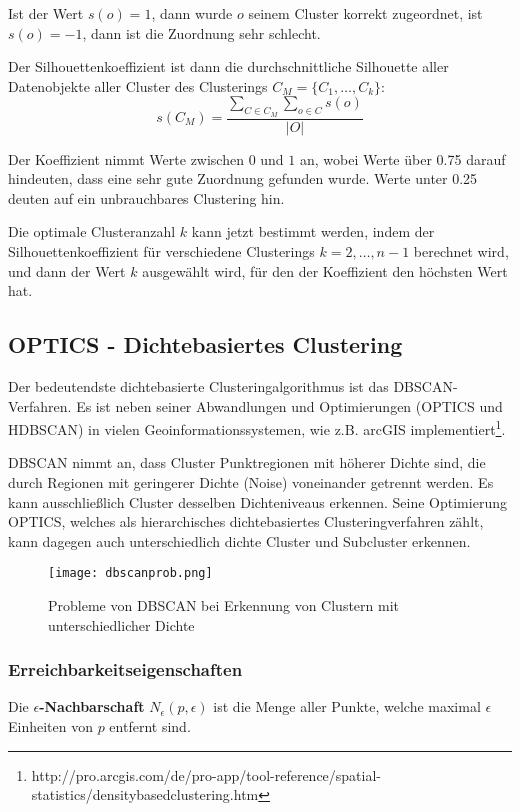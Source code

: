 \documentclass[11pt,fleqn]{book}
\begin{document}
Ist der Wert $s(o) = 1$, dann wurde $o$ seinem Cluster korrekt zugeordnet, ist $s(o) = -1$, dann ist die Zuordnung sehr schlecht.

Der Silhouettenkoeffizient ist dann die durchschnittliche Silhouette aller Datenobjekte aller Cluster des Clusterings $C_M = \{C_1, \dots, C_k\}$:
$$s(C_M) = \frac{\sum\limits_{C \in C_M} \sum\limits_{o \in C} s(o)} {|O|}$$

Der Koeffizient nimmt Werte zwischen $0$ und $1$ an, wobei Werte über 0.75 darauf hindeuten, dass eine sehr gute Zuordnung gefunden wurde. Werte unter 0.25 deuten auf ein unbrauchbares Clustering hin.

Die optimale Clusteranzahl $k$ kann jetzt bestimmt werden, indem der Silhouettenkoeffizient für verschiedene Clusterings $k = 2, \dots, n-1$ berechnet wird, und dann der Wert $k$ ausgewählt wird, für den der Koeffizient den höchsten Wert hat.


\subsection{OPTICS - Dichtebasiertes Clustering}
Der bedeutendste dichtebasierte Clusteringalgorithmus ist das DBSCAN-Verfahren. Es ist neben seiner Abwandlungen und Optimierungen (OPTICS und HDBSCAN) in vielen Geoinformationssystemen, wie z.B. arcGIS implementiert\footnote{http://pro.arcgis.com/de/pro-app/tool-reference/spatial-statistics/densitybasedclustering.htm}. 

DBSCAN nimmt an, dass Cluster Punktregionen mit höherer Dichte sind, die durch Regionen mit geringerer Dichte (Noise) voneinander getrennt werden. Es kann ausschließlich Cluster desselben Dichteniveaus erkennen. Seine Optimierung OPTICS, welches als hierarchisches dichtebasiertes Clusteringverfahren zählt, kann dagegen auch unterschiedlich dichte Cluster und Subcluster erkennen.

\begin{figure}[h]
\centering
\texttt{[image: dbscanprob.png]}
\caption{Probleme von DBSCAN bei Erkennung von Clustern mit unterschiedlicher Dichte}\label{cluster}
\end{figure}

\subsubsection{Erreichbarkeitseigenschaften \cite{dbscan}}
Die \textbf{$\epsilon$-Nachbarschaft} $N_\epsilon(p,\epsilon)$ ist die Menge aller Punkte, welche maximal $\epsilon$ Einheiten von $p$ entfernt sind.
 
\end{document}
